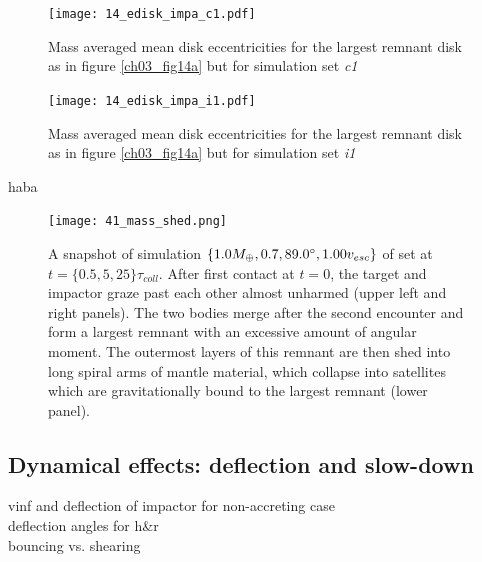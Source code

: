 {\begin{landscape}
\begin{figure}
\begin{center}
\texttt{[image: 14\_edisk\_impa\_c1.pdf]}
\caption{Mass averaged mean disk eccentricities for the largest remnant disk as in figure \ref{ch03_fig14a} but for simulation set \emph{c1}}
\label{ch03_fig14b}
\end{center}
\end{figure}

\begin{figure}
\begin{center}
\texttt{[image: 14\_edisk\_impa\_i1.pdf]}
\caption{Mass averaged mean disk eccentricities for the largest remnant disk as in figure \ref{ch03_fig14a} but for simulation set \emph{i1}}
\label{ch03_fig14c}
\end{center}
\end{figure}
\end{landscape}
}

haba

\begin{figure}[h!]
\begin{center}
\texttt{[image: 41\_mass\_shed.png]}
\caption{A snapshot of simulation $\{ 1.0 M_{\oplus}, 0.7, 89.0 ^\circ, 1.00 v_{esc}\}$ of set \css at $t = \{0.5, 5, 25\} \tau_{coll}$. After first contact at $t = 0$, the target and impactor graze past each other almost unharmed (upper left and right panels). The two bodies merge after the second encounter and form a largest remnant with an excessive amount of angular moment. The outermost layers of this remnant are then shed into long spiral arms of mantle material, which collapse into satellites which are gravitationally bound to the largest remnant (lower panel).}
\label{ch03_fig41}
\end{center}
\end{figure}


\subsection{Dynamical effects: deflection and slow-down}
vinf and deflection of impactor for non-accreting case\\
deflection angles for h\&r \\
bouncing vs. shearing \\

